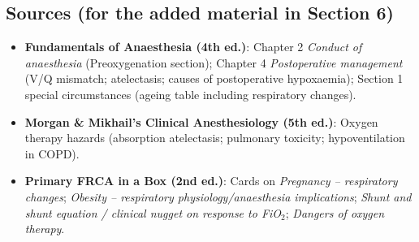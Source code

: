\documentclass[11pt,a4paper]{article}
\begin{document}
\subsection{Sources (for the added material in Section 6)}
\begin{itemize}
  \item \textbf{Fundamentals of Anaesthesia (4th ed.)}: Chapter 2 \emph{Conduct of anaesthesia} (Preoxygenation section); Chapter 4 \emph{Postoperative management} (V/Q mismatch; atelectasis; causes of postoperative hypoxaemia); Section 1 special circumstances (ageing table including respiratory changes).
  \item \textbf{Morgan \& Mikhail’s Clinical Anesthesiology (5th ed.)}: Oxygen therapy hazards (absorption atelectasis; pulmonary toxicity; hypoventilation in COPD).
  \item \textbf{Primary FRCA in a Box (2nd ed.)}: Cards on \emph{Pregnancy -- respiratory changes}; \emph{Obesity -- respiratory physiology/anaesthesia implications}; \emph{Shunt and shunt equation / clinical nugget on response to FiO$_2$}; \emph{Dangers of oxygen therapy}.
\end{itemize}
\end{document}
